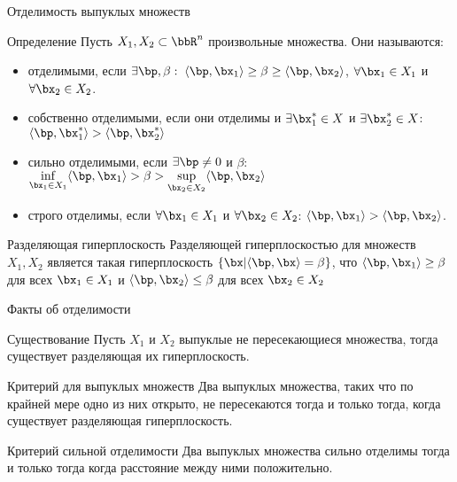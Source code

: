 \documentclass[12pt]{beamer}
\begin{document}
\begin{frame}{Отделимость выпуклых множеств}
\small
\begin{block}{Определение}
Пусть $X_1, X_2 \subset \bbR^n$ произвольные множества. Они называются:
\vspace{-3mm}
\begin{itemize}
\item отделимыми, если $\exists \bp, \beta: \; \langle\bp, \bx_1 \rangle \geq \beta \geq \langle \bp, \bx_2\rangle$, $\forall \bx_1 \in X_1$ и $\forall \bx_2 \in X_2$.
\vspace{-3mm}
\item собственно отделимыми, если они отделимы и $\exists \bx_1^* \in X$ и $\exists \bx_2^* \in X$: $\langle \bp, \bx_1^* \rangle > \langle \bp, \bx_2^* \rangle$
\vspace{-3mm}
\item сильно отделимыми, если $\exists \bp \neq 0$ и $\beta$: $\inf\limits_{\bx_1 \in X_1} \langle \bp, \bx_1 \rangle > \beta > \sup\limits_{\bx_2 \in X_2} \langle \bp, \bx_2 \rangle$
\vspace{-3mm}
\item строго отделимы, если $\forall \bx_1 \in X_1$ и $\forall \bx_2 \in X_2$: $\langle \bp, \bx_1 \rangle > \langle \bp, \bx_2 \rangle$.
\end{itemize} 
\end{block}

\begin{block}{Разделяющая гиперплоскость}
Разделяющей гиперплоскостью для множеств $X_1, X_2$ является такая гиперплоскость $\{ \bx | \langle \bp, \bx \rangle = \beta \}$, что $\langle \bp, \bx_1 \rangle \geq \beta$ для всех $\bx_1 \in X_1$ и $\langle \bp, \bx_2 \rangle \leq \beta$ для всех $\bx_2 \in X_2$   
\end{block}
\end{frame}

\begin{frame}{Факты об отделимости}
\begin{block}{Существование}
Пусть $X_1$ и $X_2$ выпуклые не пересекающиеся множества, тогда существует разделяющая их гиперплоскость. 
\end{block}

\begin{block}{Критерий для выпуклых множеств}
Два выпуклых множества, таких что по крайней мере одно из них открыто, не пересекаются тогда и только тогда, когда существует разделяющая гиперплоскость.
\end{block}

\begin{block}{Критерий сильной отделимости}
Два выпуклых множества сильно отделимы тогда и только тогда когда расстояние между ними положительно.
\end{block}

\end{frame}
\end{document}
